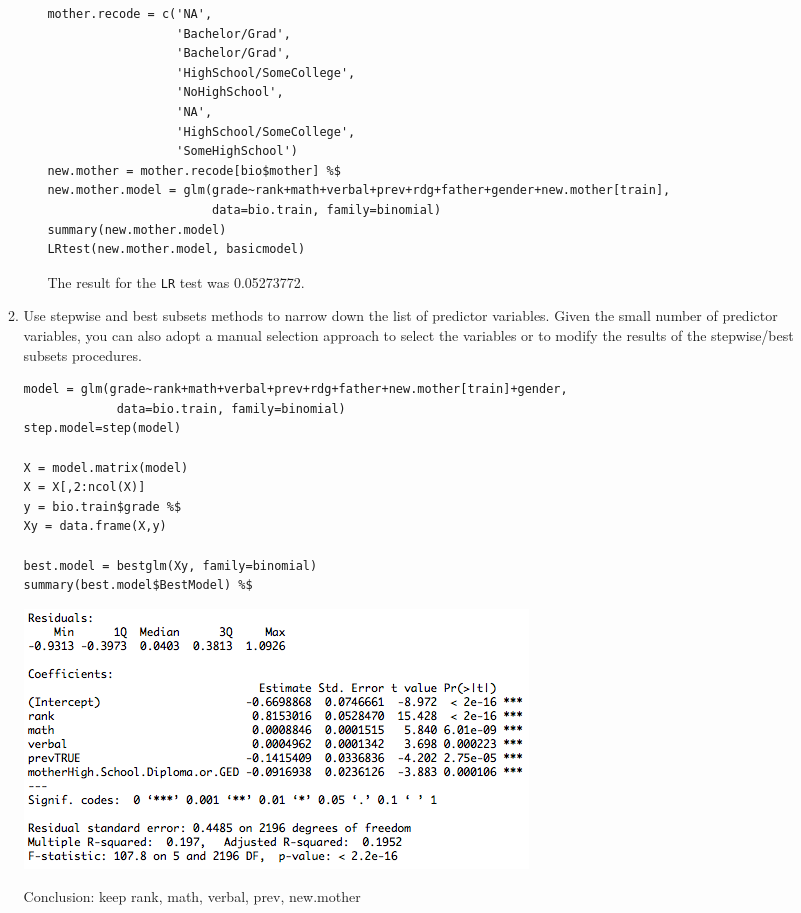 \documentclass[11pt]{article}
\begin{document}
\begin{enumerate}
\begin{enumerate}
\begin{itemize}
\begin{Verbatim}
mother.recode = c('NA', 
                  'Bachelor/Grad', 
                  'Bachelor/Grad', 
                  'HighSchool/SomeCollege', 
                  'NoHighSchool', 
                  'NA', 
                  'HighSchool/SomeCollege', 
                  'SomeHighSchool')
new.mother = mother.recode[bio$mother] %$
new.mother.model = glm(grade~rank+math+verbal+prev+rdg+father+gender+new.mother[train], 
                       data=bio.train, family=binomial)
summary(new.mother.model)
LRtest(new.mother.model, basicmodel)
\end{Verbatim}
	The result for the \verb|LR| test was 0.05273772.
	\end{itemize}

	\item Use stepwise and best subsets methods to narrow down the list of predictor 
	         variables. Given the small number of predictor variables, you can also adopt 
	         a manual selection approach to select the variables or to modify the results 
	         of the stepwise/best subsets procedures.

\begin{Verbatim}
model = glm(grade~rank+math+verbal+prev+rdg+father+new.mother[train]+gender, 
             data=bio.train, family=binomial)
step.model=step(model)

X = model.matrix(model)
X = X[,2:ncol(X)]
y = bio.train$grade %$
Xy = data.frame(X,y)

best.model = bestglm(Xy, family=binomial)
summary(best.model$BestModel) %$
\end{Verbatim}
		\begin{center}
			\includegraphics[scale=0.7]{best_model_summary}
		\end{center}
          Conclusion: keep rank, math, verbal, prev, new.mother



\end{enumerate}
\end{enumerate}
\end{document}
